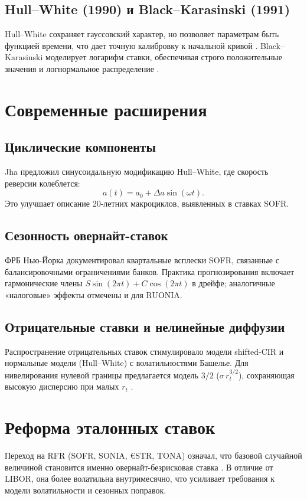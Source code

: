 \subsection{Hull--White (1990) и Black--Karasinski (1991)}
Hull--White сохраняет гауссовский характер, но позволяет параметрам быть функцией времени, что дает точную калибровку к начальной кривой \autocite{HullWhite1990}. Black--Karasinski моделирует логарифм ставки, обеспечивая строго положительные значения и логнормальное распределение \autocite{BlackKarasinski1991}.

\section{Современные расширения}
\subsection{Циклические компоненты}
Jha \autocite{Jha2025} предложил синусоидальную модификацию Hull--White, где скорость реверсии колеблется:
\[
  a(t) = a_0 + \Delta a \sin(\omega t).
\]
Это улучшает описание 20-летних макроциклов, выявленных в ставках SOFR.

\subsection{Сезонность овернайт-ставок}
ФРБ Нью-Йорка \autocite{FRBNY2020} документировал квартальные всплески SOFR, связанные с балансировочными ограничениями банков. Практика прогнозирования включает гармонические члены $S\sin(2\pi t) + C\cos(2\pi t)$ в дрейфе; аналогичные «налоговые» эффекты отмечены и для RUONIA.

\subsection{Отрицательные ставки и нелинейные диффузии}
Распространение отрицательных ставок стимулировало модели shifted-CIR и нормальные модели (Hull--White) с волатильностями Башелье. Для нивелирования нулевой границы предлагается модель $3/2$ ($\sigma\,r_t^{3/2}$), сохраняющая высокую дисперсию при малых $r_t$ \autocite{Rogers2024threehalf}.

\section{Реформа эталонных ставок}
Переход на RFR (SOFR, SONIA, \euro{}STR, TONA) означал, что базовой случайной величиной становится именно овернайт-безрисковая ставка \autocite{BIS2019}. В отличие от LIBOR, она более волатильна внутримесячно, что усиливает требования к модели волатильности и сезонных поправок.

